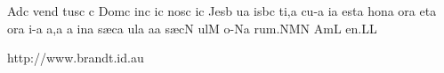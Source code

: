 \sgn {}Ad\punctum c\egn
\sgn ven\punctum d\egn
\sgn tus\punctum c\egn
\spatium
\custos c
\lineaproxima
\sgn Dom\punctum c\egn
\sgn {}in\punctum c\egn
\sgn {}i{}\punctum c\egn
\spatium
\sgn nos\punctum c\egn
{}i{}\punctum c\egn
\spatium
\sgn Jes\punctum b\egn
\sgn {}u{}\punctum a\egn
\spatium
{}is\pes bc\egn
\sgn ti,\punctum a\egn
\spatium
\divisiominima
\spatium
\sgn cu-\punctum a\egn
\sgn {}i{}\punctum a\egn
\spatium
\sgn {}e{st}\punctum a\egn
\spatium
\sgn hon\punctum a\egn
\sgn {}or\punctum a\egn
\spatium
\sgn {}et\punctum a\egn
\spatium
{}or\punctum a\egn
\sgn {}i-\punctum a\egn
\sgn {}a,\punctum a\egn
\spatium
\custos a
\lineaproxima
\sgn {}in\punctum a\egn
\spatium
\sgn s{\ae}c\punctum a\egn
\sgn {}ul\punctum a\egn
\sgn {}a{}\punctum a\egn
\spatium
\sgn s{\ae}c\punctum N\egn
\sgn {}ul\punctum M\egn
\sgn {}o-\pes Na\egn
\sgn ru{m.}\clivis NM\augmentum N\egn
\spatium
\divisiomaior
\spatium
\sgn {}Am\punctum L\egn
\sgn {}e{n.}\punctum L\augmentum L\egn
\spatium
\Finisgregoriana

\vfill

\centerline{http://www.brandt.id.au}

\eject

\bye
